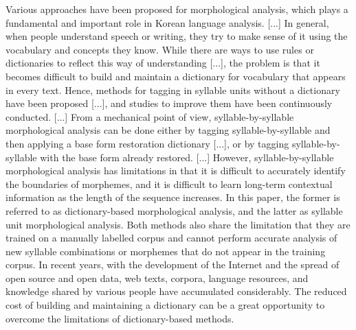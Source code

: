 \documentclass[AMS,STIX2COL]{WileyNJD-v2}
\begin{document}

    Various approaches have been proposed for morphological analysis, which plays a fundamental and important role in Korean language analysis. [...]
    In general, when people understand speech or writing, they try to make sense of it using the vocabulary and concepts they know.
    While there are ways to use rules or dictionaries to reflect this way of understanding [...], the problem is that it becomes difficult to build and maintain a dictionary for vocabulary that appears in every text.
    Hence, methods for tagging in syllable units without a dictionary have been proposed [...], and studies to improve them have been continuously conducted. [...]
    From a mechanical point of view, syllable-by-syllable morphological analysis can be done either by tagging syllable-by-syllable and then applying a base form restoration dictionary [...], or by tagging syllable-by-syllable with the base form already restored. [...]
    However, syllable-by-syllable morphological analysis has limitations in that it is difficult to accurately identify the boundaries of morphemes, and it is difficult to learn long-term contextual information as the length of the sequence increases.
    In this paper, the former is referred to as dictionary-based morphological analysis, and the latter as syllable unit morphological analysis.
    Both methods also share the limitation that they are trained on a manually labelled corpus and cannot perform accurate analysis of new syllable combinations or morphemes that do not appear in the training corpus.
    In recent years, with the development of the Internet and the spread of open source and open data, web texts, corpora, language resources, and knowledge shared by various people have accumulated considerably.
    The reduced cost of building and maintaining a dictionary can be a great opportunity to overcome the limitations of dictionary-based methods.
\end{document}
